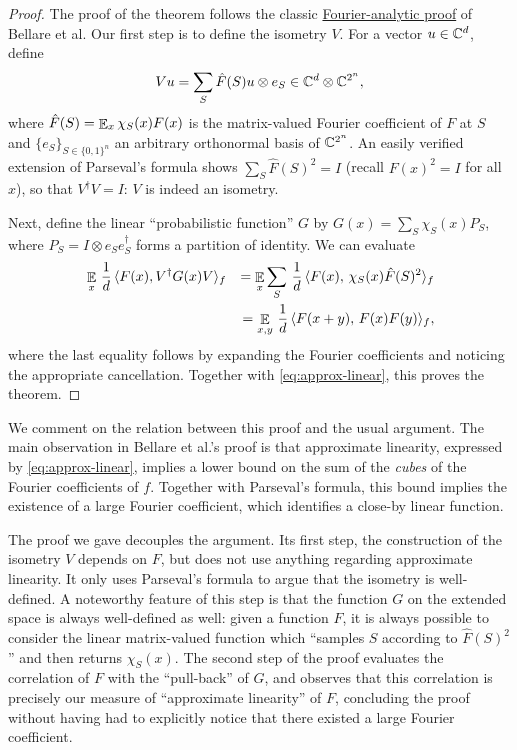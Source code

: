 \begin{proof}
The proof of the theorem follows the classic \href{http://ieeexplore.ieee.org/document/556674/}{Fourier-analytic proof} of Bellare et al.
 Our first step is to define the isometry $V$. For a vector $u\in \mathbb{C}^d$, define 
$$V u  = \sum_S \hat{F}(S) u \otimes e_S \in \mathbb{C}^d \otimes \mathbb{C}^{2^n},$$
where $\hat{F}(S) = \mathop{\mathbb{E}}\displaylimits_{x} \chi_S(x) F(x)$ is the matrix-valued Fourier coefficient of $F$ at $S$ and $\{e_S\}_{S\in\{0,1\}^n}$ an arbitrary orthonormal basis of $\mathbb{C}^{2^n}$. An easily verified extension of Parseval's formula shows $\sum_S \hat{F}(S)^2 = I$ (recall $F(x)^2=I$ for all $x$), so that $V^\dagger V = I$: $V$ is indeed an isometry. 

Next, define the linear ``probabilistic function'' $G$ by $G(x) =  \sum_S \chi_S(x) P_S$, where $P_S = I \otimes e_Se_S^\dagger$ forms a partition of identity. We can evaluate
\begin{eqnarray*}
&\mathop{\mathbb{E}}\displaylimits_{x} \,\frac{1}{d}\,\langle F(x),V^\dagger G(x)V \rangle_f &= \mathop{\mathbb{E}}\displaylimits_{x} \sum_{S}\,\frac{1}{d}\,\langle  F(x),\, \chi_S(x) \hat{F}(S)^2 \rangle_f \\
&&= \mathop{\mathbb{E}}\displaylimits_{x,y} \,\frac{1}{d}\,\langle F(x+y),\,F(x)F(y) \rangle_f,
\end{eqnarray*}
where the last equality follows by expanding the Fourier coefficients and noticing the appropriate cancellation. Together with \eqref{eq:approx-linear}, this proves the theorem. 
\end{proof}

We comment on the relation between this proof and the usual argument. The main observation in  Bellare et al.'s proof  is that approximate linearity, expressed by \eqref{eq:approx-linear}, implies a lower bound on the sum of the \emph{cubes} of the Fourier coefficients of $f$. Together with Parseval's formula, this bound implies the existence of a large Fourier coefficient, which identifies a close-by linear function. 

The proof we gave decouples the argument. Its first step, the construction of the isometry $V$ depends on $F$, but does not use anything regarding approximate linearity. It only uses Parseval's formula to argue that the isometry is well-defined. A noteworthy feature of this step is that the function $G$ on the extended space is always well-defined as well: given a function $F$, it is always possible to consider the linear matrix-valued function which ``samples $S$ according to $\hat{F}(S)^2$'' and then returns $\chi_S(x)$. The second step of the proof evaluates the correlation of $F$ with the ``pull-back'' of $G$, and observes that this correlation is precisely our measure of ``approximate linearity'' of $F$, concluding the proof  without having had to explicitly notice that there existed a large Fourier coefficient. 

